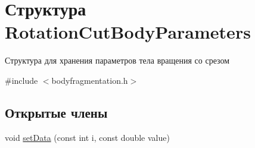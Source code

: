 \hypertarget{struct_rotation_cut_body_parameters}{}\section{Структура Rotation\+Cut\+Body\+Parameters}
\label{struct_rotation_cut_body_parameters}


Структура для хранения параметров тела вращения со срезом  




{\ttfamily \#include $<$bodyfragmentation.\+h$>$}

\subsection*{Открытые члены}
\begin{DoxyCompactItemize}
\item 
void \mbox{\hyperlink{struct_rotation_cut_body_parameters_a8f8166704d1f04e836ad98145ce79581}{set\+Data}} (const int i, const double value)
\end{DoxyCompactItemize}
